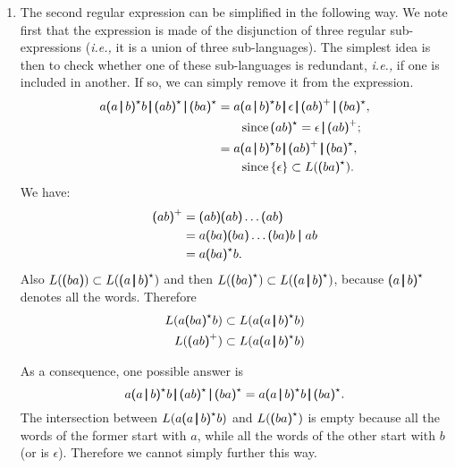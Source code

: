\begin{enumerate}
  \item The second regular expression can be simplified in the
    following way. We note first that the expression is made of the
    disjunction of three regular sub-expressions (\emph{i.e.,} it is a
    union of three sub-languages). The simplest idea is then to check
    whether one of these sub-languages is redundant, \emph{i.e.,} if
    one is included in another. If so, we can simply remove it from
    the expression.
  \begin{align*}
     a \textsf{(} a \, \pmb{\lvert}{} \, b \textsf{)}^{\star}{} b 
     \, \pmb{\lvert}{} \, \textsf{(} a b \textsf{)}^{\star}{} 
     \, \pmb{\lvert}{} \, \textsf{(} b a \textsf{)}^{\star}
     &= a \textsf{(} a \, \pmb{\lvert}{} \, b \textsf{)}^{\star}{} b 
     \, \pmb{\lvert}{} \, \epsilon
     \, \pmb{\lvert}{} \, \textsf{(} a b \textsf{)}^{+}{} 
     \, \pmb{\lvert}{} \, \textsf{(} b a \textsf{)}^{\star},\\
     & \qquad \text{since} \, \textsf{(} ab \textsf{)}^{\star} =
     \epsilon \, \pmb{\lvert}{}\, \textsf{(} ab \textsf{)}^{+};\\
     &= a \textsf{(} a \, \pmb{\lvert}{} \, b \textsf{)}^{\star}{} b 
     \, \pmb{\lvert}{} \, \textsf{(} a b \textsf{)}^{+}{} 
     \, \pmb{\lvert}{} \, \textsf{(} b a \textsf{)}^{\star},\\
     & \qquad \text{since} \, \{\epsilon\} \subset L(\textsf{(} ba
     \textsf{)}^{\star}).
  \end{align*}
  We have:
  \begin{align*}
    \textsf{(} ab\textsf{)}^{+}
   &= \textsf{(} ab\textsf{)} \textsf{(} ab\textsf{)} \ldots \textsf{(} ab \textsf{)}\\
   &= a\textsf{(} ba\textsf{)}\textsf{(} ba\textsf{)}\ldots\textsf{(}  ba\textsf{)} b \;
    \pmb{\lvert}{} \; ab\\
   &= a\textsf{(} ba \textsf{)}^{\star} b.
   \end{align*}
   Also \(L(\textsf{(} ba \textsf{)}) \subset L(\textsf{(} a \, \pmb{\lvert}{}
   \, b\textsf{)}^{\star})\) and then \(L(\textsf{(} ba
   \textsf{)}^{\star}) \subset L(\textsf{(} a \, \pmb{\lvert}{} \,
   b\textsf{)}^{\star})\), because \(\textsf{(} a \, \pmb{\lvert}{} \,
   b\textsf{)}^{\star}\) denotes all the words. Therefore
   \begin{align*}
      L(a\textsf{(} ba \textsf{)}^{\star} b) 
    &\subset L(a \textsf{(} a \, \pmb{\lvert}{} \, b\textsf{)}^{\star} b)\\
      L(\textsf{(} ab\textsf{)}^{+}) 
    &\subset L(a \textsf{(} a \, \pmb{\lvert}{} \, b\textsf{)}^{\star} b)
   \end{align*}

   As a consequence, one possible answer is
   \begin{equation*}  
     a \textsf{(} a \, \pmb{\lvert}{} \, b \textsf{)}^{\star}{} b 
     \, \pmb{\lvert}{} \, \textsf{(} a b \textsf{)}^{\star}{} 
     \, \pmb{\lvert}{} \, \textsf{(} b a \textsf{)}^{\star}
     = a \textsf{(} a \, \pmb{\lvert}{} \, b\textsf{)}^{\star} b 
     \, \pmb{\lvert}{} \, \textsf{(} ba \textsf{)}^{\star}.
   \end{equation*}
   The intersection between \(L(a \textsf{(} a \, \pmb{\lvert}{} \,
   b\textsf{)}^{\star} b)\) and \(L(\textsf{(} ba \textsf{)}^{\star})\)
   is empty because all the words of the former start with
     \(a\), while all the words of the other start with \(b\) (or is
     \(\epsilon\)).  Therefore we cannot simply further this way.

\end{enumerate}
